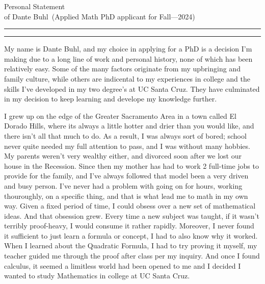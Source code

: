 \documentclass{article}
\newcommand{\soptitle}{Personal Statement}
\newcommand{\yourname}{Dante Buhl}
\begin{document}
\begin{center}\LARGE\soptitle\\
\large of \yourname\ (Applied Math PhD applicant for Fall---2024)
\end{center}

\hrule
\vspace{1pt}
\hrule height 1pt

\bigskip

My name is Dante Buhl, and my choice in applying for a PhD is a decision I'm making due to a long line of work and personal history, none of which has been relatively easy. Some of the many factors originate from my upbringing and family culture, while others are indicental to my experiences in college and the skills I've developed in my two degree's at UC Santa Cruz. They have culminated in my decision to keep learning and develope my knowledge further. 

I grew up on the edge of the Greater Sacramento Area in a town called El Dorado Hills, where its always a little hotter and drier than you would like, and there isn't all that much to do. As a result, I was always sort of bored; school never quite needed my full attention to pass, and I was without many hobbies. My parents weren't very wealthy either, and divorced soon after we lost our house in the Recession. Since then my mother has had to work 2 full-time jobs to provide for the family, and I've always followed that model been a very driven and busy person. I've never had a problem with going on for hours, working thouroughly, on a specific thing, and that is what lead me to math in my own way. Given a fixed period of time, I could obsess over a new set of mathematical ideas. And that obsession grew. Every time a new subject was taught, if it wasn't terribly proof-heavy, I would consume it rather rapidly. Moreover, I never found it sufficient to just learn a formula or concept, I had to also know why it worked. When I learned about the Quadratic Formula, I had to try proving it myself, my teacher guided me through the proof after class per my inquiry. And once I found calculus, it seemed a limitless world had been opened to me and I decided I wanted to study Mathematics in college at UC Santa Cruz.
\end{document}
